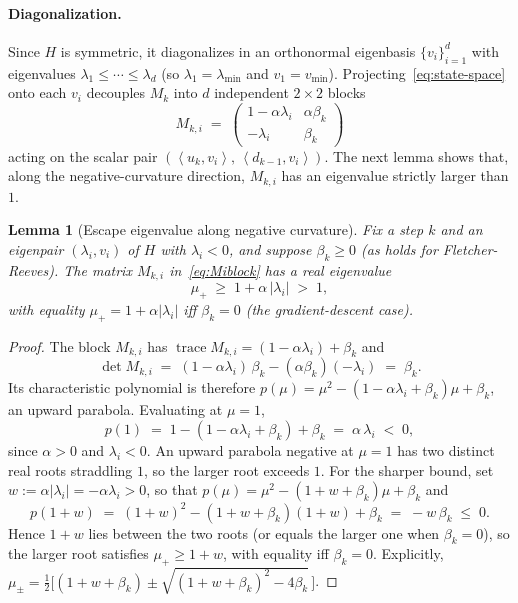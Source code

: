 \documentclass[11pt,a4paper]{article}
\theoremstyle{plain}
\newtheorem{lemma}{Lemma}
\theoremstyle{definition}
\newcommand{\inner}[2]{\left\langle #1,#2 \right\rangle}
\newcommand{\vmin}{v_{\min}}
\newcommand{\lmin}{\lambda_{\min}}
\begin{document}
\paragraph{Diagonalization.}
Since $H$ is symmetric, it diagonalizes in an orthonormal eigenbasis
$\{v_{i}\}_{i=1}^{d}$ with eigenvalues $\lambda_{1}\le\cdots\le\lambda_{d}$
(so $\lambda_{1}=\lmin$ and $v_{1}=\vmin$). Projecting~\eqref{eq:state-space}
onto each $v_{i}$ decouples $M_{k}$ into $d$ independent $2\times2$ blocks
\begin{equation}\label{eq:Miblock}
M_{k,i} \;=\; \begin{pmatrix}
   1-\alpha\lambda_{i} & \alpha\beta_{k} \\ -\lambda_{i} & \beta_{k}
\end{pmatrix}
\end{equation}
acting on the scalar pair $(\inner{u_{k}}{v_{i}},\,\inner{d_{k-1}}{v_{i}})$.
The next lemma shows that, along the negative-curvature direction,
$M_{k,i}$ has an eigenvalue strictly larger than $1$.

\begin{lemma}[Escape eigenvalue along negative curvature]\label{lem:escapeeig}
Fix a step $k$ and an eigenpair $(\lambda_{i},v_{i})$ of $H$ with
$\lambda_{i}<0$, and suppose $\beta_{k}\ge 0$ (as holds for Fletcher-Reeves). The matrix $M_{k,i}$
in~\eqref{eq:Miblock} has a real eigenvalue
\begin{equation}\label{eq:mu-plus}
\mu_{+} \;\ge\; 1 + \alpha\,|\lambda_{i}| \;>\; 1,
\end{equation}
with equality $\mu_{+}=1+\alpha|\lambda_{i}|$ iff $\beta_{k}=0$
(the gradient-descent case).
\end{lemma}

\begin{proof}
The block $M_{k,i}$ has $\operatorname{trace}M_{k,i} = (1-\alpha\lambda_{i})+\beta_{k}$
and
\[
\det M_{k,i}
   \;=\; (1-\alpha\lambda_{i})\,\beta_{k} - (\alpha\beta_{k})(-\lambda_{i})
   \;=\; \beta_{k}.
\]
Its characteristic polynomial is therefore
$p(\mu) = \mu^{2} - (1-\alpha\lambda_{i}+\beta_{k})\mu + \beta_{k}$,
an upward parabola. Evaluating at $\mu=1$,
\[
p(1) \;=\; 1 - (1-\alpha\lambda_{i}+\beta_{k}) + \beta_{k}
     \;=\; \alpha\,\lambda_{i} \;<\; 0,
\]
since $\alpha>0$ and $\lambda_{i}<0$. An upward parabola negative at $\mu=1$
has two distinct real roots straddling $1$, so the larger root exceeds $1$.
For the sharper bound, set $w:=\alpha|\lambda_{i}|=-\alpha\lambda_{i}>0$, so
that $p(\mu)=\mu^{2}-(1+w+\beta_{k})\mu+\beta_{k}$ and
\[
p(1+w) \;=\; (1+w)^{2}-(1+w+\beta_{k})(1+w)+\beta_{k}
        \;=\; -w\,\beta_{k} \;\le\; 0.
\]
Hence $1+w$ lies between the two roots (or equals the larger one when
$\beta_{k}=0$), so the larger root satisfies
$\mu_{+}\ge 1+w$, with equality iff $\beta_{k}=0$. Explicitly,
$\mu_{\pm}=\tfrac{1}{2}\bigl[(1+w+\beta_{k}) \pm
\sqrt{(1+w+\beta_{k})^{2}-4\beta_{k}}\,\bigr]$.
\end{proof}
\end{document}
